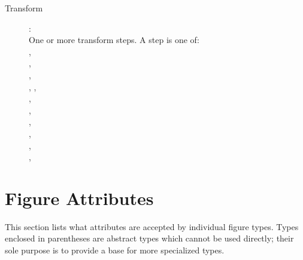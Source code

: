 \begin{description}
\item[Transform]: \\
One or more transform steps. A step is one of: \\
, \\
, \\
, \\
, , \\
, \\
, \\
, \\
, \\
, \\
, \\

\end{description}



\section{Figure Attributes}
\label{sec:figure-definitions:figure-attributes}

This section lists what attributes are accepted by individual figure types.
Types enclosed in parentheses are abstract types which cannot be used
directly; their sole purpose is to provide a base for more specialized
types.

